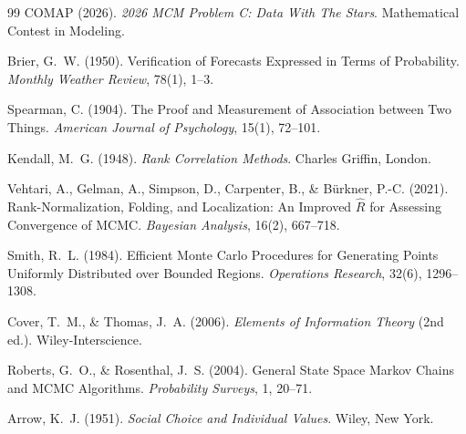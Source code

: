 \documentclass{article}
\begin{document}
\begin{thebibliography}{99}
COMAP (2026).
\emph{2026 MCM Problem C: Data With The Stars}.
Mathematical Contest in Modeling.


Brier, G.~W. (1950).
Verification of Forecasts Expressed in Terms of Probability.
\emph{Monthly Weather Review}, 78(1), 1--3.

Spearman, C. (1904).
The Proof and Measurement of Association between Two Things.
\emph{American Journal of Psychology}, 15(1), 72--101.

Kendall, M.~G. (1948).
\emph{Rank Correlation Methods}.
Charles Griffin, London.

Vehtari, A., Gelman, A., Simpson, D., Carpenter, B., \& B\"urkner, P.-C. (2021).
Rank-Normalization, Folding, and Localization: An Improved $\hat R$ for Assessing
Convergence of MCMC.
\emph{Bayesian Analysis}, 16(2), 667--718.

Smith, R.~L. (1984).
Efficient Monte Carlo Procedures for Generating Points Uniformly Distributed over Bounded
Regions.
\emph{Operations Research}, 32(6), 1296--1308.

Cover, T.~M., \& Thomas, J.~A. (2006).
\emph{Elements of Information Theory} (2nd ed.).
Wiley-Interscience.

Roberts, G.~O., \& Rosenthal, J.~S. (2004).
General State Space Markov Chains and MCMC Algorithms.
\emph{Probability Surveys}, 1, 20--71.

Arrow, K.~J. (1951).
\emph{Social Choice and Individual Values}.
Wiley, New York.

\end{thebibliography}
\end{document}
